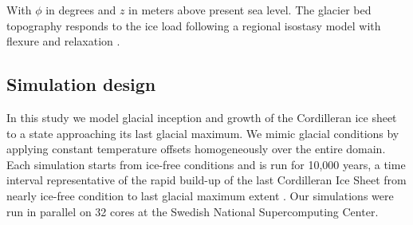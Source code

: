 With $\phi$ in degrees and $z$ in meters above present sea level. The glacier bed topography responds to the ice load following a regional isostasy model with flexure and relaxation \citep{lingle-clark-1985}.

\subsection{Simulation design}

In this study we model glacial inception and growth of the Cordilleran ice sheet to a state approaching its last glacial maximum. We mimic glacial conditions by applying constant temperature offsets homogeneously over the entire domain. Each simulation starts from ice-free conditions and is run for 10,000 years, a time interval representative of the rapid build-up of the last Cordilleran Ice Sheet from nearly ice-free condition to last glacial maximum extent \citep{clague-1989}. Our simulations were run in parallel on 32 cores at the Swedish National Supercomputing Center.

